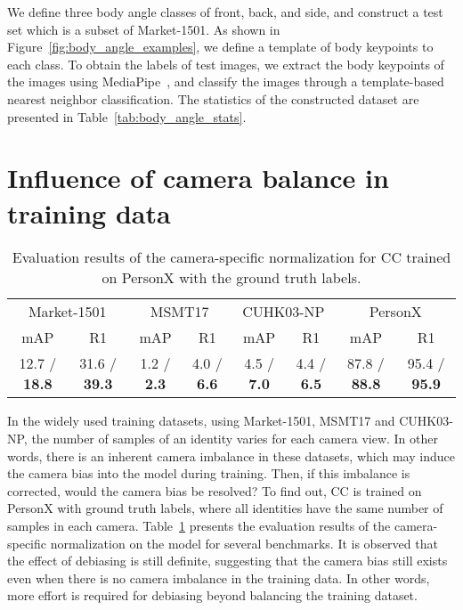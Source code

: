 We define three body angle classes of front, back, and side, and construct a test set which is a subset of Market-1501.
As shown in Figure~\ref{fig:body_angle_examples}, we define a template of body keypoints to each class.
To obtain the labels of test images, we extract the body keypoints of the images using MediaPipe~\citep{mediapipe}, and classify the images through a template-based nearest neighbor classification.
The statistics of the constructed dataset are presented in Table~\ref{tab:body_angle_stats}.

\section{Influence of camera balance in training data}
\label{sup:camera_imbalance_in_training}

\begin{table}[H]
    \caption{
        Evaluation results of the camera-specific normalization for CC trained on PersonX with the ground truth labels.
    }
    \vspace{3pt}
    \label{tab:camera_imbalance}
    \centering
    {
    \renewcommand{\arraystretch}{1.2}
    \begin{tabular}{cc|cc|cc|cc}
        \hline
        \multicolumn{2}{c|}{Market-1501} & 
        \multicolumn{2}{c|}{MSMT17} & 
        \multicolumn{2}{c|}{CUHK03-NP} &
        \multicolumn{2}{c}{PersonX} \\
        
        \cline{1-8}
        mAP & R1 & mAP & R1 & mAP & R1 & mAP & R1 \\ 
        \hline \hline
        
        12.7 / \textbf{18.8} & 31.6 / \textbf{39.3} & 1.2 / \textbf{2.3} & 4.0 / \textbf{6.6} & 4.5 / \textbf{7.0} & 4.4  / \textbf{6.5} & 87.8 / \textbf{88.8} & 95.4 / \textbf{95.9} \\
        \hline
    \end{tabular}
    }
\end{table}

In the widely used training datasets, using Market-1501, MSMT17 and CUHK03-NP, the number of samples of an identity varies for each camera view.
In other words, there is an inherent camera imbalance in these datasets, which may induce the camera bias into the model during training.
Then, if this imbalance is corrected, would the camera bias be resolved?
To find out, CC is trained on PersonX with ground truth labels, where all identities have the same number of samples in each camera.
Table~\ref{tab:camera_imbalance} presents the evaluation results of the camera-specific normalization on the model for several benchmarks.
It is observed that the effect of debiasing is still definite, suggesting that the camera bias still exists even when there is no camera imbalance in the training data.
In other words, more effort is required for debiasing beyond balancing the training dataset.


